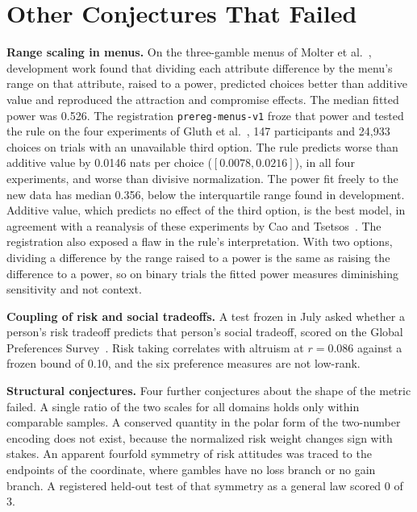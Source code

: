 \documentclass[journal]{IEEEtran}
\begin{document}
\section{Other Conjectures That Failed}
\label{sec:rejected}

\textbf{Range scaling in menus.}
On the three-gamble menus of Molter et al.~\cite{molter2022}, development work found that dividing each attribute difference by the menu's range on that attribute, raised to a power, predicted choices better than additive value and reproduced the attraction and compromise effects.
The median fitted power was 0.526.
The registration \texttt{prereg-menus-v1} froze that power and tested the rule on the four experiments of Gluth et al.~\cite{gluth2018}, 147 participants and 24{,}933 choices on trials with an unavailable third option.
The rule predicts worse than additive value by 0.0146 nats per choice ($[0.0078,0.0216]$), in all four experiments, and worse than divisive normalization.
The power fit freely to the new data has median 0.356, below the interquartile range found in development.
Additive value, which predicts no effect of the third option, is the best model, in agreement with a reanalysis of these experiments by Cao and Tsetsos~\cite{cao2022}.
The registration also exposed a flaw in the rule's interpretation.
With two options, dividing a difference by the range raised to a power is the same as raising the difference to a power, so on binary trials the fitted power measures diminishing sensitivity and not context.

\textbf{Coupling of risk and social tradeoffs.}
A test frozen in July asked whether a person's risk tradeoff predicts that person's social tradeoff, scored on the Global Preferences Survey~\cite{falk2018}.
Risk taking correlates with altruism at $r=0.086$ against a frozen bound of 0.10, and the six preference measures are not low-rank.

\textbf{Structural conjectures.}
Four further conjectures about the shape of the metric failed.
A single ratio of the two scales for all domains holds only within comparable samples.
A conserved quantity in the polar form of the two-number encoding does not exist, because the normalized risk weight changes sign with stakes.
An apparent fourfold symmetry of risk attitudes was traced to the endpoints of the coordinate, where gambles have no loss branch or no gain branch.
A registered held-out test of that symmetry as a general law scored 0 of 3.
\end{document}
